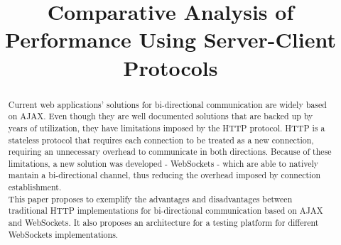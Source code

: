 \documentclass[conference]{IEEEtran}
\begin{document}
\title{Comparative Analysis of Performance Using Server-Client Protocols}

\author{
\and
{}
}

\maketitle

\begin{abstract}
Current web applications' solutions for bi-directional communication are widely
based on AJAX. Even though they are well documented solutions that are backed up by
years of utilization, they have limitations imposed by the HTTP protocol. HTTP
is a stateless protocol that requires each connection to be treated as a new
connection, requiring an unnecessary overhead to communicate in both directions.
Because of these limitations, a new solution was developed - WebSockets -
which are able to natively mantain a bi-directional channel, thus reducing the
overhead imposed by connection establishment.
\\
\indent
This paper proposes to exemplify the advantages and disadvantages between
traditional HTTP implementations for bi-directional communication based on AJAX
and WebSockets. It also proposes an architecture for a testing platform for
different WebSockets implementations.
\end{abstract}

\IEEEpeerreviewmaketitle

\end{document}
